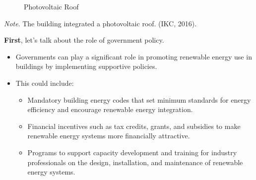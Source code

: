 \documentclass[
  letterpaper,
  DIV=11,
  numbers=noendperiod]{scrartcl}
\providecommand{\tightlist}{%
  \setlength{\itemsep}{0pt}\setlength{\parskip}{0pt}}\usepackage{longtable,booktabs,array}
\begin{document}
\begin{figure}


\caption{\label{fig-solutions}Photovoltaic Roof}

\end{figure}%

\emph{Note}. The building integrated a photovoltaic roof. (IKC, 2016).

\textbf{First}, let's talk about the role of government policy.

\begin{itemize}
\tightlist
\item
  Governments can play a significant role in promoting renewable energy
  use in buildings by implementing supportive policies.
\item
  This could include:

  \begin{itemize}
  \item
    Mandatory building energy codes that set minimum standards for
    energy efficiency and encourage renewable energy integration.
  \item
    Financial incentives such as tax credits, grants, and subsidies to
    make renewable energy systems more financially attractive.
  \item
    Programs to support capacity development and training for industry
    professionals on the design, installation, and maintenance of
    renewable energy systems.
  \end{itemize}
\end{itemize}
\end{document}
